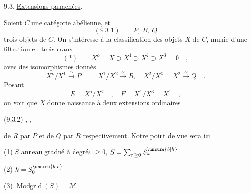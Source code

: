 9.3. \uline{Extensions panachées}.

Soient $\underline C$ une catégorie abélienne, et
\[
(9.3.1)\qquad P,\ R,\ Q
\]
trois objets de $\underline C$. On s'intéresse à la classification des objets $X$ de $\underline C$, munie d'une filtration en trois crans
\[
(*)\qquad X^o=X\supset X^1\supset X^2\supset X^3=0\quad,
\]
avec des isomorphismes donnés
\[
X^o/X^1\overset{\sim}{\longrightarrow}P\quad,\quad
X^1/X^2\overset{\sim}{\longrightarrow}R,\quad
X^2/X^3=X^2\overset{\sim}{\longrightarrow}Q\quad.
\]
Posant
\[
E=X^o/X^2\quad,\quad F=X^1/X^3=X^1\quad,
\]
on voit que $X$ donne naissance à deux extensions ordinaires

(9.3.2)
\quad,\quad
{}
\quad,

de $R$ par $P$ et de $Q$ par $R$ respectivement. Notre point de vue sera ici


(1) $S$ anneau gradué  \uline{à degrés $\geq0$}, $S=\sum_{n\geq0}S_n^{\unsure{b|h}}$


(2) $k=S_0^{\unsure{b|h}}$

(3) $\operatorname{Modgr.d}(S)=\mathcal M$

